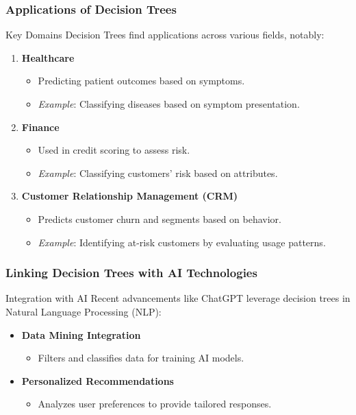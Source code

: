 \documentclass[aspectratio=169]{beamer}
\begin{document}
\begin{frame}[fragile]
    \frametitle{Applications of Decision Trees}
    \begin{block}{Key Domains}
        Decision Trees find applications across various fields, notably:
    \end{block}
    \begin{enumerate}
        \item \textbf{Healthcare}
            \begin{itemize}
                \item Predicting patient outcomes based on symptoms.
                \item \textit{Example}: Classifying diseases based on symptom presentation.
            \end{itemize}

        \item \textbf{Finance}
            \begin{itemize}
                \item Used in credit scoring to assess risk.
                \item \textit{Example}: Classifying customers' risk based on attributes.
            \end{itemize}
        
        \item \textbf{Customer Relationship Management (CRM)}
            \begin{itemize}
                \item Predicts customer churn and segments based on behavior.
                \item \textit{Example}: Identifying at-risk customers by evaluating usage patterns.
            \end{itemize}
    \end{enumerate}
\end{frame}

\begin{frame}[fragile]
    \frametitle{Linking Decision Trees with AI Technologies}
    \begin{block}{Integration with AI}
        Recent advancements like ChatGPT leverage decision trees in Natural Language Processing (NLP):
    \end{block}
    \begin{itemize}
        \item \textbf{Data Mining Integration}
            \begin{itemize}
                \item Filters and classifies data for training AI models.
            \end{itemize}
        
        \item \textbf{Personalized Recommendations}
            \begin{itemize}
                \item Analyzes user preferences to provide tailored responses.
            \end{itemize}
    \end{itemize}
\end{frame}
\end{document}
